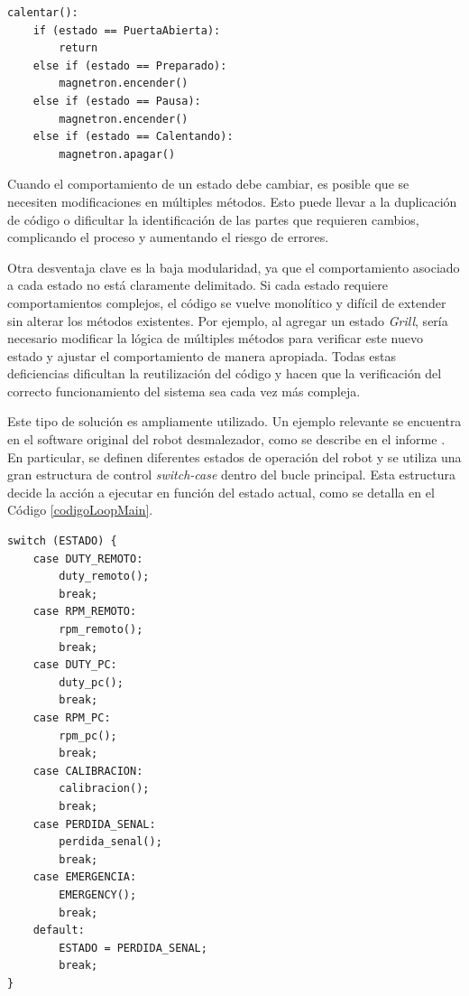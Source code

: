 \begin{lstlisting}[label=nuevoEstado,caption={Ejemplo de introducción de un nuevo estado a la solución tradicional.}]
calentar():
    if (estado == PuertaAbierta):
        return
    else if (estado == Preparado):
        magnetron.encender()
    else if (estado == Pausa):
        magnetron.encender()
    else if (estado == Calentando):
        magnetron.apagar()

\end{lstlisting}

Cuando el comportamiento de un estado debe cambiar, es posible que se necesiten modificaciones en múltiples métodos. Esto puede llevar a la duplicación de código o dificultar la identificación de las partes que requieren cambios, complicando el proceso y aumentando el riesgo de errores. 

Otra desventaja clave es la baja modularidad, ya que el comportamiento asociado a cada estado no está claramente delimitado. Si cada estado requiere comportamientos complejos, el código se vuelve monolítico y difícil de extender sin alterar los métodos existentes. Por ejemplo, al agregar un estado \textit{Grill}, sería necesario modificar la lógica de múltiples métodos para verificar este nuevo estado y ajustar el comportamiento de manera apropiada. Todas estas deficiencias dificultan la reutilización del código y hacen que la verificación del correcto funcionamiento del sistema sea cada vez más compleja.

Este tipo de solución es ampliamente utilizado. Un ejemplo relevante se encuentra en el software original del robot desmalezador, como se describe en el informe \cite{informe1}. En particular, se definen diferentes estados de operación del robot y se utiliza una gran estructura de control \textit{switch-case} dentro del bucle principal. Esta estructura decide la acción a ejecutar en función del estado actual, como se detalla en el Código \ref{codigoLoopMain}.
\newpage

\begin{lstlisting}[caption=Main loop firmware original (o previo) del robot desmalezador \cite{informe1}, label={codigoLoopMain}]
switch (ESTADO) {
    case DUTY_REMOTO:
        duty_remoto();
        break;
    case RPM_REMOTO:
        rpm_remoto();
        break;
    case DUTY_PC:
        duty_pc();
        break;
    case RPM_PC:
        rpm_pc();
        break;    
    case CALIBRACION:
        calibracion();
        break;
    case PERDIDA_SENAL:
        perdida_senal();
        break;
    case EMERGENCIA:
        EMERGENCY();
        break;
    default:
        ESTADO = PERDIDA_SENAL;
        break;
}
\end{lstlisting}

